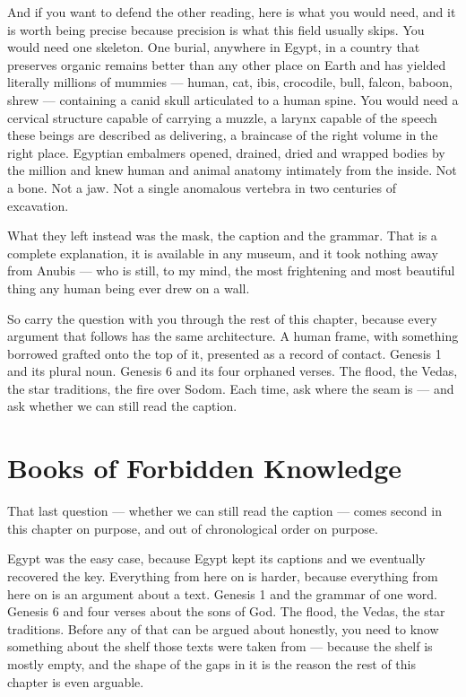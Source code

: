 And if you want to defend the other reading, here is what you would need, and it is worth being
precise because precision is what this field usually skips. You would need one skeleton. One
burial, anywhere in Egypt, in a country that preserves organic remains better than any other
place on Earth and has yielded literally millions of mummies --- human, cat, ibis, crocodile,
bull, falcon, baboon, shrew --- containing a canid skull articulated to a human spine. You would
need a cervical structure capable of carrying a muzzle, a larynx capable of the speech these
beings are described as delivering, a braincase of the right volume in the right place. Egyptian
embalmers opened, drained, dried and wrapped bodies by the million and knew human and animal
anatomy intimately from the inside.  Not a bone. Not a jaw. Not a single anomalous vertebra in two
centuries of excavation.

What they left instead was the mask, the caption and the grammar. That is a complete
explanation, it is available in any museum, and it took nothing away from Anubis --- who is
still, to my mind, the most frightening and most beautiful thing any human being ever drew on a
wall.

So carry the question with you through the rest of this chapter, because every argument that
follows has the same architecture. A human frame, with something borrowed grafted onto the top of
it, presented as a record of contact. Genesis 1 and its plural noun. Genesis 6 and its four
orphaned verses. The flood, the Vedas, the star traditions, the fire over Sodom. Each time, ask
where the seam is --- and ask whether we can still read the caption.

\section{Books of Forbidden Knowledge}\label{sec:booksforbiddenknowledge}

That last question --- whether we can still read the caption --- comes second in this chapter on
purpose, and out of chronological order on purpose.

Egypt was the easy case, because Egypt kept its captions and we eventually recovered the key.
Everything from here on is harder, because everything from here on is an argument about a text. Genesis 1 and the grammar of one
word. Genesis 6 and four verses about the sons of God. The flood, the Vedas, the star
traditions. Before any of that can be argued about honestly, you need to know something
about the shelf those texts were taken from --- because the shelf is mostly empty, and the
shape of the gaps in it is the reason the rest of this chapter is even arguable.

